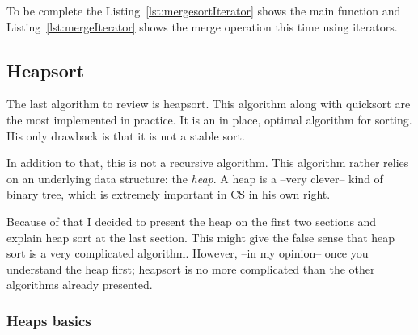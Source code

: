 
To be complete the Listing~\ref{lst:mergesortIterator} shows the main function and Listing~\ref{lst:mergeIterator} shows the merge operation this time using iterators.



\subsection{Heapsort}

The last algorithm to review is heapsort.
This algorithm along with quicksort are the most implemented in practice.
It is an in place, optimal algorithm for sorting.
His only drawback is that it is not a stable sort.

In addition to that, this is not a recursive algorithm.
This algorithm rather relies on an underlying data structure: the \emph{heap}.
A heap is a --very clever-- kind of binary tree, which is extremely important in CS in his own right.

Because of that I decided to present the heap on the first two sections and explain heap sort at the last section.
This might give the false sense that heap sort is a very complicated algorithm.
However, --in my opinion-- once you  understand the heap first; heapsort is no more complicated than the other algorithms already presented.

\subsubsection{Heaps basics}

